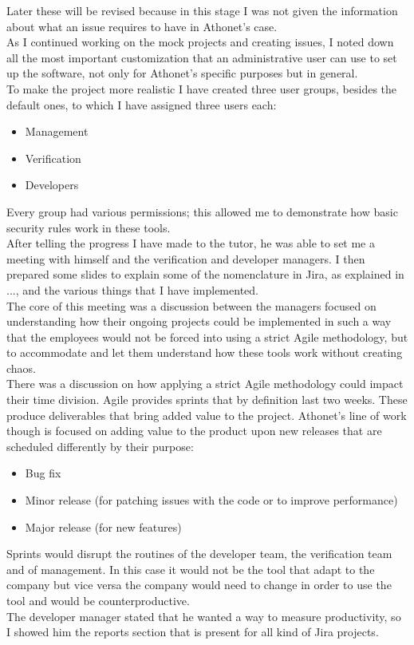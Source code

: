 	Later these will be revised because in this stage I was not given the information about what an issue requires to have in Athonet's case.\\	
	As I continued working on the mock projects and creating issues, I noted down all the most important customization that an administrative user can use to set up the software, not only for Athonet's specific purposes but in general.\\	
	To make the project more realistic I have created three user groups, besides the default ones, to which I have assigned three users each:
	\begin{itemize}
		\item Management
		\item Verification
		\item Developers
	\end{itemize}
	Every group had various permissions; this allowed me to demonstrate how basic security rules work in these tools.\\
	After telling the progress I have made to the tutor, he was able to set me a meeting with himself and the verification and developer managers.
	I then prepared some slides to explain some of the nomenclature in Jira, as explained in ..., and the various things that I have implemented.\\
	The core of this meeting was a discussion between the managers focused on understanding how their ongoing projects could be implemented in such a way that the employees would not be forced into using a strict Agile methodology, but to accommodate and let them understand how these tools work without creating chaos.\\
	There was a discussion on how applying a strict Agile methodology could impact their time division.
	Agile provides sprints that by definition last two weeks.
	These produce deliverables that bring added value to the project.
	Athonet's line of work though is focused on adding value to the product upon new releases that are scheduled differently by their purpose:
	\begin{itemize}
		\item Bug fix
		\item Minor release (for patching issues with the code or to improve performance)
		\item Major release (for new features)
	\end{itemize}
	Sprints would disrupt the routines of the developer team, the verification team and of management.
	In this case it would not be the tool that adapt to the company but vice versa the company would need to change in order to use the tool and would be counterproductive.\\
	The developer manager stated that he wanted a way to measure productivity, so I showed him the reports section that is present for all kind of Jira projects.
	

